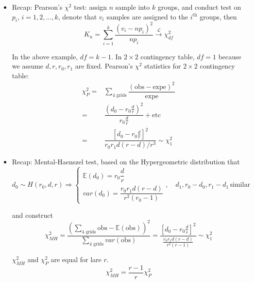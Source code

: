 \begin{itemize}[topsep=2pt,itemsep=0pt]
    \item Recap: Pearson's $ \chi^2 $ test: assign $ n $ sample into $ k $ groups, and conduct test on $ p_i $, $ i=1,2,\ldots,k $, denote that $ v_i $ samples are assigned to the $ i^\mathrm{th}  $ groups, then
    \begin{equation}
        K_n=\sum_{i=1}^k\dfrac{(v_i-np_i)^2}{np_i}\xrightarrow[]{\mathscr{L}} \chi^2_{df}
    \end{equation}

    In the above example, $ df=k-1 $. In $ 2\times 2 $ contingency table, $ df=1 $ because we assume $ d,r,r_0,r_1 $ are fixed. Pearson's $ \chi^2 $ statistics for $ 2\times 2 $ contingency table:
    \begin{align}
        \chi^2_P=&\sum_{4\text{ grids}}\dfrac{(\mathrm{obs}-\mathrm{expe})^2}{\mathrm{expe} }\\
        =&\dfrac{(d_0-r_0\frac{d}{r})^2}{r_0\frac{d}{r}}+\mathrm{etc}\\
        =&\dfrac{\left[ d_0-r_0\frac{d}{r} \right]^2}{r_0r_1d(r-d)\big/ r^3} \sim \chi^2_1
    \end{align}
    \item Recap: Mental-Haenszel test, based on the Hypergeometric distribution that 
    \begin{equation}
        d_0 \sim H(r_0,d,r)\Rightarrow \begin{cases}
            \mathbb{E}\left( d_0 \right)= r_0\dfrac{d}{r}\\
            var(d_0)=\dfrac{r_0r_1d(r-d)}{r^2(r_0-1)}
        \end{cases} ,\quad d_1,r_0-d_0,r_1-d_1 \,\mathrm{similar} 
    \end{equation}

    and construct
    \begin{equation}
        \chi^2_{MH}=\dfrac{\left(\sum_{4\text{ grids}}\mathrm{obs}-\mathbb{E}\left( \mathrm{obs}  \right)\right)^2  }{\sum_{4\text{ grids}} var(\mathrm{obs} )}=\dfrac{\left[ d_0-r_0\frac{d}{r} \right]^2}{\frac{r_0r_1d(r-d)}{r^2(r-1)}}\sim \chi^2_1
    \end{equation}
        
    $ \chi^2_{{MH}} $ and $ \chi^2_{P} $ are equal for lare $ r $.
    \begin{equation}
        \chi^2_{MH}=\dfrac{r-1}{r}\chi^2_P 
    \end{equation}


\end{itemize}
